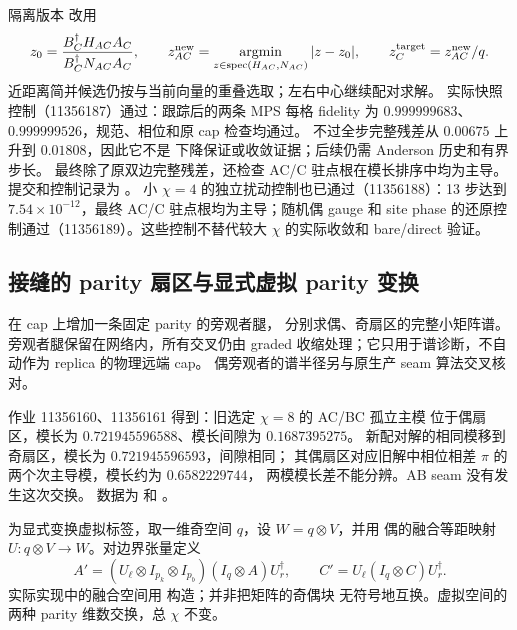 隔离版本  改用
\begin{equation}
 z_0=\frac{B_C^\dagger H_{AC}A_C}{B_C^\dagger N_{AC}A_C},\qquad
 z_{AC}^{\rm new}=\underset{z\in\operatorname{spec}(H_{AC},N_{AC})}
 {\operatorname{argmin}}\,|z-z_0|,
 \qquad z_C^{\rm target}=z_{AC}^{\rm new}/q.
\end{equation}
近距离简并候选仍按与当前向量的重叠选取；左右中心继续配对求解。
实际快照控制（11356187）通过：跟踪后的两条 MPS 每格 fidelity 为
$0.999999683$、$0.999999526$，规范、相位和原 cap 检查均通过。
不过全步完整残差从 $0.00675$ 上升到 $0.01808$，因此它不是
下降保证或收敛证据；后续仍需 Anderson 历史和有界步长。
最终除了原双边完整残差，还检查 AC/C 驻点根在模长排序中均为主导。
提交和控制记录为 。
小 $\chi=4$ 的独立扰动控制也已通过（11356188）：13 步达到
$7.54\times10^{-12}$，最终 AC/C 驻点根均为主导；随机偶 gauge 和
site phase 的还原控制通过（11356189）。这些控制不替代较大 $\chi$
的实际收敛和 bare/direct 验证。

\subsection{接缝的 parity 扇区与显式虚拟 parity 变换}
 在 cap 上增加一条固定 parity 的旁观者腿，
分别求偶、奇扇区的完整小矩阵谱。旁观者腿保留在网络内，所有交叉仍由
graded 收缩处理；它只用于谱诊断，不自动作为 replica 的物理远端 cap。
偶旁观者的谱半径另与原生产 seam 算法交叉核对。

作业 11356160、11356161 得到：旧选定 $\chi=8$ 的 AC/BC 孤立主模
位于偶扇区，模长为 $0.721945596588$、模长间隙为 $0.1687395275$。
新配对解的相同模移到奇扇区，模长为 $0.721945596593$，间隙相同；
其偶扇区对应旧解中相位相差 $\pi$ 的两个次主导模，模长约为 $0.6582229744$，
两模模长差不能分辨。AB seam 没有发生这次交换。
数据为  和 。

为显式变换虚拟标签，取一维奇空间 $q$，设 $W=q\otimes V$，并用
偶的融合等距映射 $U: q\otimes V\to W$。对边界张量定义
\begin{equation}
 A'=(U_\ell\otimes I_{p_k}\otimes I_{p_b})
 (I_q\otimes A)U_r^\dagger,\qquad
 C'=U_\ell(I_q\otimes C)U_r^\dagger.
\end{equation}
实际实现中的融合空间用  构造；并非把矩阵的奇偶块
无符号地互换。虚拟空间的两种 parity 维数交换，总 $\chi$ 不变。

